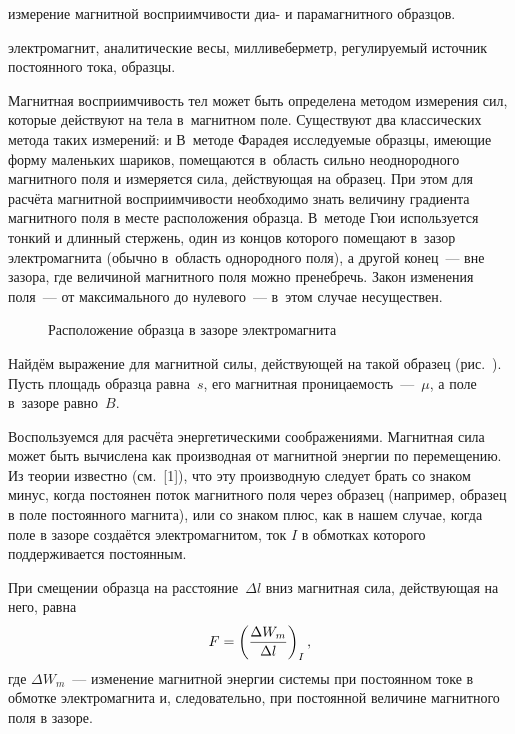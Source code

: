 
\begin{lab:aim}
	измерение магнитной восприимчивости диа- и парамагнитного образцов.
\end{lab:aim}

\begin{lab:equipment}
	электромагнит, аналитические весы, милливеберметр,  регулируемый источник постоянного тока, образцы.
\end{lab:equipment}

Магнитная восприимчивость тел может быть определена методом измерения сил, которые действуют на тела в~магнитном поле.
Существуют два классических метода таких измерений:  и  В~методе Фарадея
исследуемые образцы, имеющие форму маленьких шариков, помещаются в~область сильно неоднородного магнитного поля и
измеряется сила, действующая на образец. При этом для расчёта магнитной восприимчивости необходимо знать величину
градиента магнитного поля в месте расположения образца. В~методе Гюи используется тонкий и длинный стержень, один из
концов которого помещают в~зазор электромагнита (обычно в~область однородного поля), а другой конец~--- вне зазора, где
величиной магнитного поля можно пренебречь. Закон изменения поля~--- от максимального до нулевого~--- в~этом случае
несуществен.

\begin{wrapfigure}{r}{0.4\textwidth}
	\caption{Расположение образца в зазоре электромагнита}
\end{wrapfigure}

Найдём выражение для магнитной силы, действующей на такой образец (рис.~). Пусть площадь образца равна~$s$, его магнитная
проницаемость~---~$\mu$, а поле в~зазоре равно~$B$.

Воспользуемся для расчёта энергетическими соображениями. Магнитная сила может быть вычислена как производная от
магнитной энергии по перемещению. Из теории известно (см.~[1]), что эту производную следует брать со знаком минус, когда
постоянен поток магнитного поля через образец (например, образец в поле постоянного магнита), или со знаком плюс, как в нашем случае, когда поле в зазоре создаётся
электромагнитом, ток $I$ в обмотках которого поддерживается постоянным.

При смещении образца на расстояние~$\Delta l$ вниз магнитная сила, действующая на него, равна
\begin{equation}%
	\eqmark{force}
	F=\left(\frac{\Delta W_m}{\Delta l}\right)_I,
\end{equation}
где $\Delta W_m$~--- изменение магнитной энергии системы при постоянном токе в обмотке электромагнита и, следовательно, при
постоянной величине магнитного поля в зазоре.

